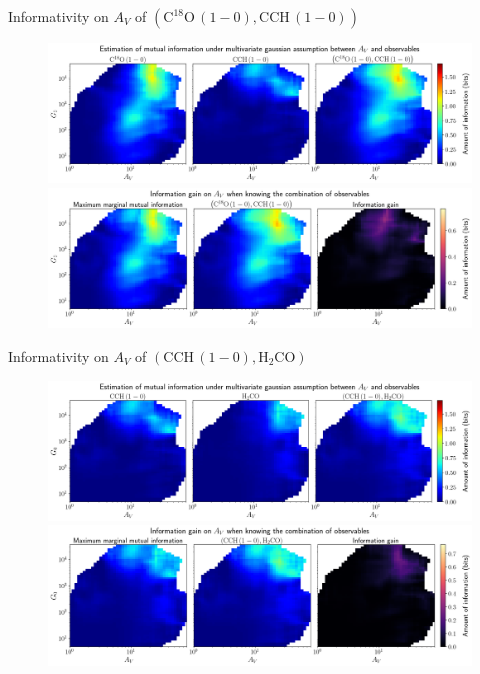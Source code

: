 \documentclass{beamer}
\begin{document}
\begin{frame}{Informativity on $A_V$ of $\left(\mathrm{C^{18}O\,(1-0)},\mathrm{CCH\,(1-0)}\right)$}
    \begin{figure}
        \centering
        \includegraphics[width=0.95\linewidth]{../linearinfo/av__c18o10_cch10_linearinfo.png}
        \vfill
        \includegraphics[width=0.95\linewidth]{../linearinfo/av__c18o10_cch10_linearinfo_gain.png}
    \end{figure}
\end{frame}

\begin{frame}{Informativity on $A_V$ of $\left(\mathrm{CCH\,(1-0)},\mathrm{H_2CO}\right)$}
    \begin{figure}
        \centering
        \includegraphics[width=0.95\linewidth]{../linearinfo/av__cch10_h2co_linearinfo.png}
        \vfill
        \includegraphics[width=0.95\linewidth]{../linearinfo/av__cch10_h2co_linearinfo_gain.png}
    \end{figure}
\end{frame}
\end{document}
